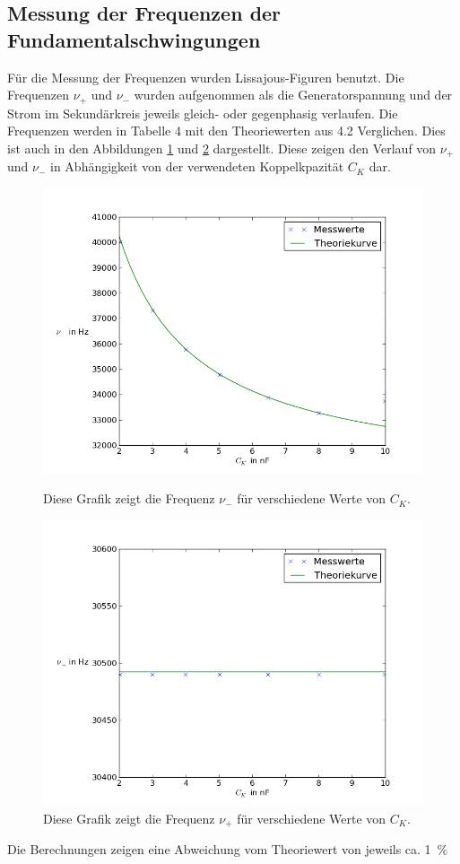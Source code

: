 \documentclass[11pt,ngerman,a4paper]{article}
\begin{document}
\subsection{Messung der Frequenzen der Fundamentalschwingungen}
Für die Messung der Frequenzen wurden Lissajous-Figuren benutzt. Die Frequenzen $\nu_+$ und $\nu_-$ wurden aufgenommen als die Generatorspannung und der Strom im Sekundärkreis jeweils gleich- oder gegenphasig verlaufen. Die Frequenzen werden in Tabelle 4 mit den Theoriewerten aus 4.2 Verglichen. Dies ist auch in den Abbildungen \ref{42} und \ref{43} dargestellt. Diese zeigen den Verlauf von $\nu_+$ und $\nu_-$ in Abhängigkeit von der verwendeten Koppelkpazität $C_K$ dar.
\begin{figure}[h!]
\centering
\includegraphics[scale=0.6]{Abb/diag2.png}
\label{42}
\caption{Diese Grafik zeigt die Frequenz $\nu_-$ für verschiedene Werte von $C_K$.}
\end{figure}
\begin{figure}[h!]
\centering
\includegraphics[scale=0.6]{Abb/diag3.png}
\caption{Diese Grafik zeigt die Frequenz $\nu_+$ für verschiedene Werte von $C_K$.}
\label{43}
\end{figure}
\noindent
Die Berechnungen zeigen eine Abweichung vom Theoriewert von jeweils ca. \SI{1}{\percent}
\end{document}
